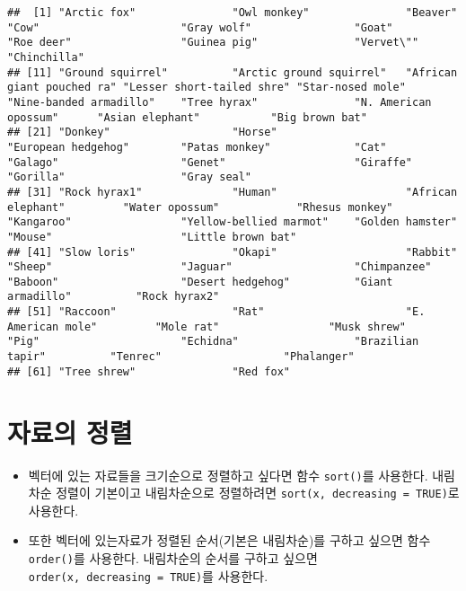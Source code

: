 \documentclass[
]{book}
\begin{document}
\begin{verbatim}
##  [1] "Arctic fox"               "Owl monkey"               "Beaver"                   "Cow"                      "Gray wolf"                "Goat"                     "Roe deer"                 "Guinea pig"               "Vervet\""                 "Chinchilla"              
## [11] "Ground squirrel"          "Arctic ground squirrel"   "African giant pouched ra" "Lesser short-tailed shre" "Star-nosed mole"          "Nine-banded armadillo"    "Tree hyrax"               "N. American opossum"      "Asian elephant"           "Big brown bat"           
## [21] "Donkey"                   "Horse"                    "European hedgehog"        "Patas monkey"             "Cat"                      "Galago"                   "Genet"                    "Giraffe"                  "Gorilla"                  "Gray seal"               
## [31] "Rock hyrax1"              "Human"                    "African elephant"         "Water opossum"            "Rhesus monkey"            "Kangaroo"                 "Yellow-bellied marmot"    "Golden hamster"           "Mouse"                    "Little brown bat"        
## [41] "Slow loris"               "Okapi"                    "Rabbit"                   "Sheep"                    "Jaguar"                   "Chimpanzee"               "Baboon"                   "Desert hedgehog"          "Giant armadillo"          "Rock hyrax2"             
## [51] "Raccoon"                  "Rat"                      "E. American mole"         "Mole rat"                 "Musk shrew"               "Pig"                      "Echidna"                  "Brazilian tapir"          "Tenrec"                   "Phalanger"               
## [61] "Tree shrew"               "Red fox"
\end{verbatim}

\hypertarget{uxc790uxb8ccuxc758-uxc815uxb82c}{%
\section{자료의 정렬}\label{uxc790uxb8ccuxc758-uxc815uxb82c}}

\begin{itemize}
\item
  벡터에 있는 자료들을 크기순으로 정렬하고 싶다면 함수 \texttt{sort()}를 사용한다. 내림차순 정렬이 기본이고 내림차순으로 정렬하려면 \texttt{sort(x,\ decreasing\ =\ TRUE)}로 사용한다.
\item
  또한 벡터에 있는자료가 정렬된 순서(기본은 내림차순)를 구하고 싶으면 함수 \texttt{order()}를 사용한다. 내림차순의 순서를 구하고 싶으면 \texttt{order(x,\ decreasing\ =\ TRUE)}를 사용한다.
\end{itemize}
\end{document}
